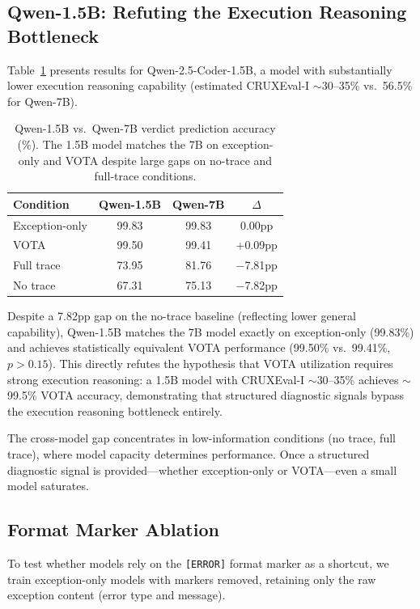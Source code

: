 \documentclass[11pt,a4paper]{article}
\begin{document}
\subsection{Qwen-1.5B: Refuting the Execution Reasoning Bottleneck}

Table~\ref{tab:qwen15b} presents results for Qwen-2.5-Coder-1.5B, a model with substantially lower execution reasoning capability (estimated CRUXEval-I ${\sim}$30--35\% vs.\ 56.5\% for Qwen-7B).

\begin{table}[t]
\centering
\small
\begin{tabular}{lccc}
\toprule
\textbf{Condition} & \textbf{Qwen-1.5B} & \textbf{Qwen-7B} & \textbf{$\Delta$} \\
\midrule
Exception-only & 99.83 & 99.83 & 0.00pp \\
VOTA           & 99.50 & 99.41 & +0.09pp \\
Full trace     & 73.95 & 81.76 & $-$7.81pp \\
No trace       & 67.31 & 75.13 & $-$7.82pp \\
\bottomrule
\end{tabular}
\caption{Qwen-1.5B vs.\ Qwen-7B verdict prediction accuracy (\%). The 1.5B model matches the 7B on exception-only and VOTA despite large gaps on no-trace and full-trace conditions.}
\label{tab:qwen15b}
\end{table}

Despite a 7.82pp gap on the no-trace baseline (reflecting lower general capability), Qwen-1.5B matches the 7B model exactly on exception-only (99.83\%) and achieves statistically equivalent VOTA performance (99.50\% vs.\ 99.41\%, $p > 0.15$).
This directly refutes the hypothesis that VOTA utilization requires strong execution reasoning: a 1.5B model with CRUXEval-I ${\sim}$30--35\% achieves ${\sim}$99.5\% VOTA accuracy, demonstrating that structured diagnostic signals bypass the execution reasoning bottleneck entirely.

The cross-model gap concentrates in low-information conditions (no trace, full trace), where model capacity determines performance.
Once a structured diagnostic signal is provided---whether exception-only or VOTA---even a small model saturates.

\subsection{Format Marker Ablation}
\label{sec:nomarker}

To test whether models rely on the \texttt{[ERROR]} format marker as a shortcut, we train exception-only models with markers removed, retaining only the raw exception content (error type and message).
\end{document}
